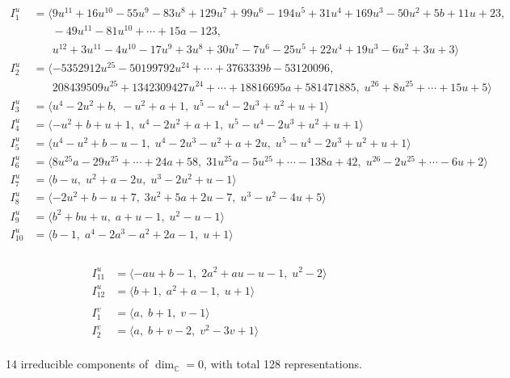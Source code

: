 \documentclass[1p]{elsarticle_modified}
\theoremstyle{definition}
\begin{document}
\begin{align*}
I^u_{1}&=\langle 
9 u^{11}+16 u^{10}-55 u^9-83 u^8+129 u^7+99 u^6-194 u^5+31 u^4+169 u^3-50 u^2+5 b+11 u+23,\\
\phantom{I^u_{1}}&\phantom{= \langle  }-49 u^{11}-81 u^{10}+\cdots+15 a-123,\\
\phantom{I^u_{1}}&\phantom{= \langle  }u^{12}+3 u^{11}-4 u^{10}-17 u^9+3 u^8+30 u^7-7 u^6-25 u^5+22 u^4+19 u^3-6 u^2+3 u+3\rangle \\
I^u_{2}&=\langle 
-5352912 u^{25}-50199792 u^{24}+\cdots+3763339 b-53120096,\\
\phantom{I^u_{2}}&\phantom{= \langle  }208439509 u^{25}+1342309427 u^{24}+\cdots+18816695 a+581471885,\;u^{26}+8 u^{25}+\cdots+15 u+5\rangle \\
I^u_{3}&=\langle 
u^4-2 u^2+b,\;- u^2+a+1,\;u^5- u^4-2 u^3+u^2+u+1\rangle \\
I^u_{4}&=\langle 
- u^2+b+u+1,\;u^4-2 u^2+a+1,\;u^5- u^4-2 u^3+u^2+u+1\rangle \\
I^u_{5}&=\langle 
u^4- u^2+b- u-1,\;u^4-2 u^3- u^2+a+2 u,\;u^5- u^4-2 u^3+u^2+u+1\rangle \\
I^u_{6}&=\langle 
8 u^{25} a-29 u^{25}+\cdots+24 a+58,\;31 u^{25} a-5 u^{25}+\cdots-138 a+42,\;u^{26}-2 u^{25}+\cdots-6 u+2\rangle \\
I^u_{7}&=\langle 
b- u,\;u^2+a-2 u,\;u^3-2 u^2+u-1\rangle \\
I^u_{8}&=\langle 
-2 u^2+b- u+7,\;3 u^2+5 a+2 u-7,\;u^3- u^2-4 u+5\rangle \\
I^u_{9}&=\langle 
b^2+b u+u,\;a+u-1,\;u^2- u-1\rangle \\
I^u_{10}&=\langle 
b-1,\;a^4-2 a^3- a^2+2 a-1,\;u+1\rangle \\
\end{align*}\\
\begin{align*}
I^u_{11}&=\langle 
- a u+b-1,\;2 a^2+a u- u-1,\;u^2-2\rangle \\
I^u_{12}&=\langle 
b+1,\;a^2+a-1,\;u+1\rangle \\
\\
I^v_{1}&=\langle 
a,\;b+1,\;v-1\rangle \\
I^v_{2}&=\langle 
a,\;b+v-2,\;v^2-3 v+1\rangle \\
\end{align*}
\raggedright * 14 irreducible components of $\dim_{\mathbb{C}}=0$, with total 128 representations.\\
\end{document}
